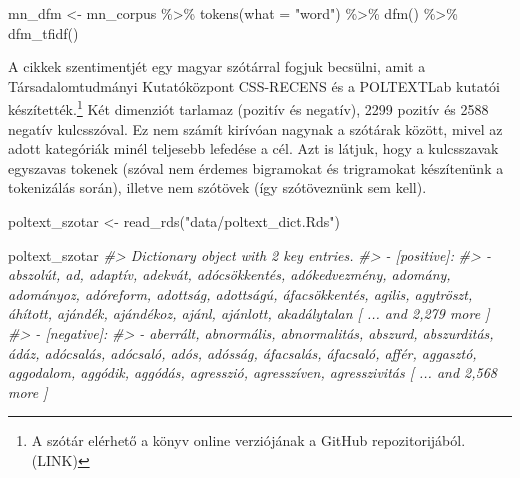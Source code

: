 \documentclass[
]{book}
\newenvironment{Shaded}{\begin{snugshade}}{\end{snugshade}}
\newcommand{\AttributeTok}[1]{\textcolor[rgb]{0.77,0.63,0.00}{#1}}
\newcommand{\CommentTok}[1]{\textcolor[rgb]{0.56,0.35,0.01}{\textit{#1}}}
\newcommand{\FunctionTok}[1]{\textcolor[rgb]{0.00,0.00,0.00}{#1}}
\newcommand{\NormalTok}[1]{#1}
\newcommand{\OtherTok}[1]{\textcolor[rgb]{0.56,0.35,0.01}{#1}}
\newcommand{\SpecialCharTok}[1]{\textcolor[rgb]{0.00,0.00,0.00}{#1}}
\newcommand{\StringTok}[1]{\textcolor[rgb]{0.31,0.60,0.02}{#1}}
\begin{document}
\begin{Shaded}
\begin{Highlighting}[]
\NormalTok{mn\_dfm }\OtherTok{\textless{}{-}}\NormalTok{ mn\_corpus }\SpecialCharTok{\%\textgreater{}\%}
  \FunctionTok{tokens}\NormalTok{(}\AttributeTok{what =} \StringTok{"word"}\NormalTok{) }\SpecialCharTok{\%\textgreater{}\%}
  \FunctionTok{dfm}\NormalTok{() }\SpecialCharTok{\%\textgreater{}\%}
  \FunctionTok{dfm\_tfidf}\NormalTok{()}
\end{Highlighting}
\end{Shaded}

A cikkek szentimentjét egy magyar szótárral fogjuk becsülni, amit a
Társadalomtudmányi Kutatóközpont CSS-RECENS és a POLTEXTLab kutatói
készítették.\footnote{A szótár elérhető a könyv online verziójának a
  GitHub repozitorijából. (LINK)} Két dimenziót tarlamaz (pozitív és
negatív), 2299 pozitív és 2588 negatív kulcsszóval. Ez nem számít
kirívóan nagynak a szótárak között, mivel az adott kategóriák minél
teljesebb lefedése a cél. Azt is látjuk, hogy a kulcsszavak egyszavas
tokenek (szóval nem érdemes bigramokat és trigramokat készítenünk a
tokenizálás során), illetve nem szótövek (így szótöveznünk sem kell).

\begin{Shaded}
\begin{Highlighting}[]
\NormalTok{poltext\_szotar }\OtherTok{\textless{}{-}} \FunctionTok{read\_rds}\NormalTok{(}\StringTok{"data/poltext\_dict.Rds"}\NormalTok{)}
\end{Highlighting}
\end{Shaded}

\begin{Shaded}
\begin{Highlighting}[]
\NormalTok{poltext\_szotar}
\CommentTok{\#\textgreater{} Dictionary object with 2 key entries.}
\CommentTok{\#\textgreater{} {-} [positive]:}
\CommentTok{\#\textgreater{}   {-} abszolút, ad, adaptív, adekvát, adócsökkentés, adókedvezmény, adomány, adományoz, adóreform, adottság, adottságú, áfacsökkentés, agilis, agytröszt, áhított, ajándék, ajándékoz, ajánl, ajánlott, akadálytalan [ ... and 2,279 more ]}
\CommentTok{\#\textgreater{} {-} [negative]:}
\CommentTok{\#\textgreater{}   {-} aberrált, abnormális, abnormalitás, abszurd, abszurditás, ádáz, adócsalás, adócsaló, adós, adósság, áfacsalás, áfacsaló, affér, aggasztó, aggodalom, aggódik, aggódás, agresszió, agresszíven, agresszivitás [ ... and 2,568 more ]}
\end{Highlighting}
\end{Shaded}
\end{document}

